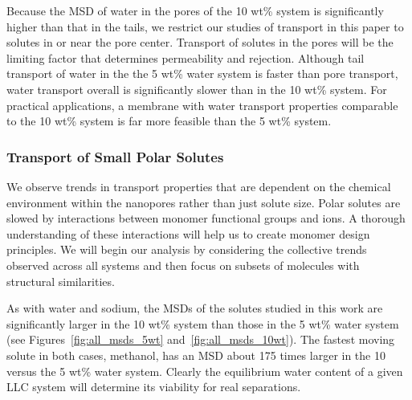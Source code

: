 \documentclass[journal=jpcbfk,manuscript=article]{achemso}
\begin{document}
  Because the MSD of water in the pores of the 10 wt\% system is significantly
  higher than that in the tails, we restrict our studies of transport in this paper to 
  solutes in or near the pore center. Transport of solutes in the pores will be the 
  limiting factor that determines permeability and rejection. Although tail transport of water in the 
  the 5 wt\% water system is faster than pore transport, water transport overall is significantly slower
  than in the 10 wt\% system. For practical applications, a membrane with water 
  transport properties comparable to the 10 wt\% system is far more feasible than
  the 5 wt\% system.
 
%  
%
%
%

 \subsubsection{Transport of Small Polar Solutes}\label{section:general_transport_solutes}  
  
  We observe trends in transport properties that are dependent on the chemical 
  environment within the nanopores rather than just solute size. Polar solutes
  are slowed by interactions between monomer functional groups and ions. 
  A thorough understanding of these interactions will help us to create monomer
  design principles. We will begin our analysis by considering the collective
  trends observed across all systems and then focus on subsets of molecules
  with structural similarities.

  As with water and sodium,
  the MSDs of the solutes studied in this work are 
  significantly larger in the 10 wt\% system than those in the 5 wt\% water 
  system (see Figures~\ref{fig:all_msds_5wt} and~\ref{fig:all_msds_10wt}). The fastest moving solute in both cases, 
  methanol, has an MSD about 175 times larger in the 10 versus the 5 wt\%
  water system. Clearly the equilibrium water content of a given LLC system will 
  determine its viability for real separations.
  
\end{document}

